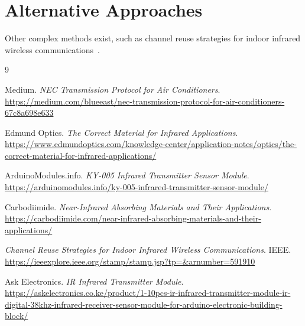 \documentclass[a4paper,12pt]{article}
\begin{document}
\section{Alternative Approaches}
Other complex methods exist, such as channel reuse strategies for indoor infrared wireless communications~\cite{IEEE}.



\begin{thebibliography}{9}

Medium. \emph{NEC Transmission Protocol for Air Conditioners}. \\
\url{https://medium.com/blueeast/nec-transmission-protocol-for-air-conditioners-67c8a698e633}

Edmund Optics. \emph{The Correct Material for Infrared Applications}. \\
\url{https://www.edmundoptics.com/knowledge-center/application-notes/optics/the-correct-material-for-infrared-applications/}

ArduinoModules.info. \emph{KY-005 Infrared Transmitter Sensor Module}. \\
\url{https://arduinomodules.info/ky-005-infrared-transmitter-sensor-module/}

Carbodiimide. \emph{Near-Infrared Absorbing Materials and Their Applications}. \\
\url{https://carbodiimide.com/near-infrared-absorbing-materials-and-their-applications/}

\emph{Channel Reuse Strategies for Indoor Infrared Wireless Communications}. IEEE. \\
\url{https://ieeexplore.ieee.org/stamp/stamp.jsp?tp=&arnumber=591910}

Ask Electronics. \emph{IR Infrared Transmitter Module}. \\
\url{https://askelectronics.co.ke/product/1-10pcs-ir-infrared-transmitter-module-ir-digital-38khz-infrared-receiver-sensor-module-for-arduino-electronic-building-block/}

\end{thebibliography}
\end{document}
